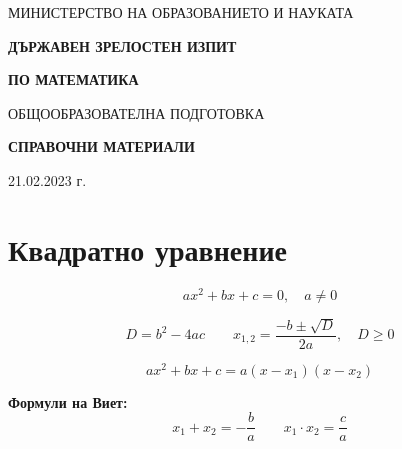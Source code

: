 \documentclass[12pt,a4paper]{article}
\begin{document}
\begin{titlepage}
\centering
\vspace*{1.5cm}

{\large МИНИСТЕРСТВО НА ОБРАЗОВАНИЕТО И НАУКАТА\par}

\vspace{2.2cm}


\vspace{0.8cm}
{\Huge\bfseries\color{titleblue} ДЪРЖАВЕН ЗРЕЛОСТЕН ИЗПИТ\par}
\vspace{0.4cm}
{\Huge\bfseries\color{titleblue} ПО МАТЕМАТИКА\par}

\vspace{1cm}
{\LARGE ОБЩООБРАЗОВАТЕЛНА ПОДГОТОВКА\par}

\vspace{0.8cm}

\vspace{1.6cm}
{\Large\bfseries СПРАВОЧНИ МАТЕРИАЛИ\par}

\vfill
\vspace{2cm}

{\normalsize 21.02.2023 г.\par}

\vspace{1cm}
\end{titlepage}

\tableofcontents
\newpage

\section{Квадратно уравнение}

$$ax^2 + bx + c = 0,\quad a \neq 0$$

$$D = b^2 - 4ac \qquad x_{1,2} = \frac{-b \pm \sqrt{D}}{2a},\quad D \geq 0$$

$$ax^2 + bx + c = a(x - x_1)(x - x_2)$$

\textbf{Формули на Виет:}
$$x_1 + x_2 = -\frac{b}{a} \qquad x_1 \cdot x_2 = \frac{c}{a}$$
\end{document}

